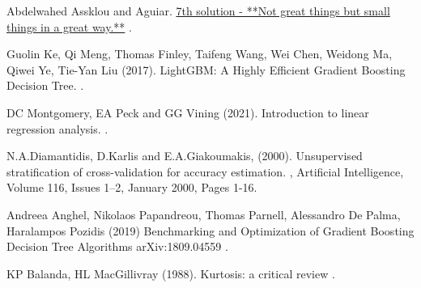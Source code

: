 \documentclass[twoside,a4paper]{article}
\begin{document}
\begin{thebibliography}{99} %

Abdelwahed Assklou and Aguiar.
\newblock \href{https://www.kaggle.com/c/home-credit-default-risk/discussion/64580}{7th solution - **Not great things but small things in a great way.**}
.

Guolin Ke, Qi Meng, Thomas Finley, Taifeng Wang, Wei Chen, Weidong Ma, Qiwei Ye, Tie-Yan Liu (2017).
\newblock LightGBM: A Highly Efficient Gradient Boosting Decision Tree.
.

DC Montgomery, EA Peck and GG Vining (2021).
\newblock Introduction to linear regression analysis.
.

N.A.Diamantidis, D.Karlis and E.A.Giakoumakis, (2000).
\newblock Unsupervised stratification of cross-validation for accuracy estimation.
, Artificial Intelligence, Volume 116, Issues 1–2, January 2000, Pages 1-16.

Andreea Anghel, Nikolaos Papandreou, Thomas Parnell, Alessandro De Palma, Haralampos Pozidis (2019)
\newblock Benchmarking and Optimization of Gradient Boosting Decision Tree Algorithms
 	arXiv:1809.04559 .

KP Balanda, HL MacGillivray (1988).
\newblock Kurtosis: a critical review
.
 
\end{thebibliography}

\end{document}
